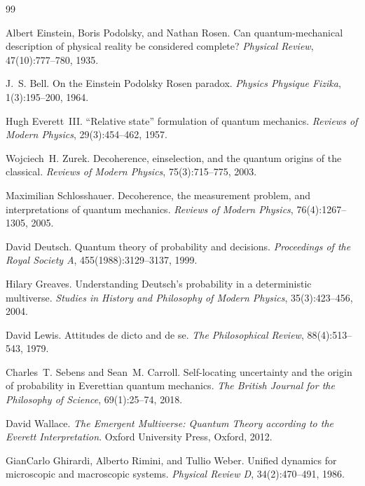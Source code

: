\begin{thebibliography}{99}

Albert Einstein, Boris Podolsky, and Nathan Rosen.
\newblock Can quantum-mechanical description of physical reality be considered complete?
\newblock \emph{Physical Review}, 47(10):777--780, 1935.

J.~S. Bell.
\newblock On the {Einstein Podolsky Rosen} paradox.
\newblock \emph{Physics Physique Fizika}, 1(3):195--200, 1964.

Hugh Everett~III.
\newblock ``Relative state'' formulation of quantum mechanics.
\newblock \emph{Reviews of Modern Physics}, 29(3):454--462, 1957.

Wojciech~H. Zurek.
\newblock Decoherence, einselection, and the quantum origins of the classical.
\newblock \emph{Reviews of Modern Physics}, 75(3):715--775, 2003.

Maximilian Schlosshauer.
\newblock Decoherence, the measurement problem, and interpretations of quantum mechanics.
\newblock \emph{Reviews of Modern Physics}, 76(4):1267--1305, 2005.

David Deutsch.
\newblock Quantum theory of probability and decisions.
\newblock \emph{Proceedings of the Royal Society A}, 455(1988):3129--3137, 1999.

Hilary Greaves.
\newblock Understanding {Deutsch}'s probability in a deterministic multiverse.
\newblock \emph{Studies in History and Philosophy of Modern Physics}, 35(3):423--456, 2004.

David Lewis.
\newblock Attitudes de dicto and de se.
\newblock \emph{The Philosophical Review}, 88(4):513--543, 1979.

Charles~T. Sebens and Sean~M. Carroll.
\newblock Self-locating uncertainty and the origin of probability in {Everettian} quantum mechanics.
\newblock \emph{The British Journal for the Philosophy of Science}, 69(1):25--74, 2018.

David Wallace.
\newblock \emph{The Emergent Multiverse: Quantum Theory according to the Everett Interpretation}.
\newblock Oxford University Press, Oxford, 2012.

GianCarlo Ghirardi, Alberto Rimini, and Tullio Weber.
\newblock Unified dynamics for microscopic and macroscopic systems.
\newblock \emph{Physical Review D}, 34(2):470--491, 1986.


\end{thebibliography}
